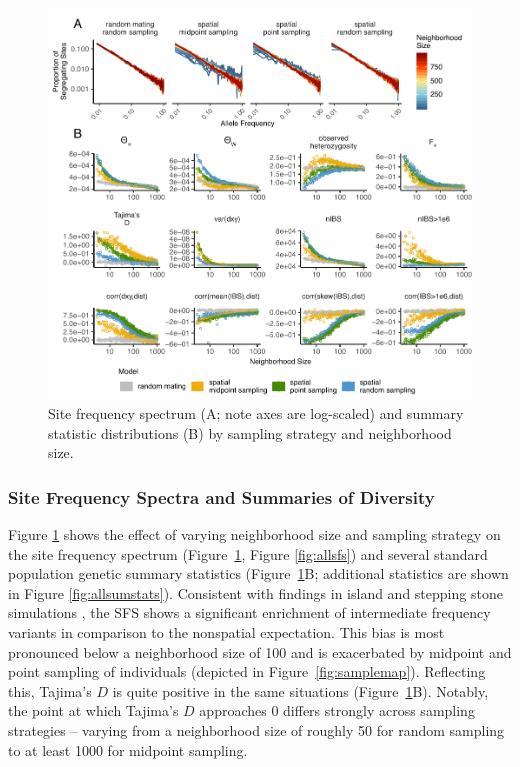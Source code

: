 \documentclass[10pt,twoside,lineno,hidelinks]{preprint}
\begin{document}
\begin{figure}[p]
\centering
\includegraphics[width=\textwidth]{figures/sfs_w_sumstats_loglog.pdf}
\caption{Site frequency spectrum (A; note axes are log-scaled) and summary statistic distributions (B) by sampling strategy and neighborhood size.}
\label{fig:sumstats}
\end{figure}


\subsubsection{Site Frequency Spectra and Summaries of Diversity}

Figure \ref{fig:sumstats} shows the effect of varying neighborhood size and sampling strategy on the site frequency spectrum (Figure~\ref{fig:sumstats}, Figure \ref{fig:allsfs}) and several standard population genetic summary statistics (Figure~\ref{fig:sumstats}B; additional statistics are shown in Figure \ref{fig:allsumstats}). Consistent with findings in island and stepping stone simulations \citep{Stadler2009}, the SFS shows a significant enrichment of intermediate frequency variants in comparison to the nonspatial expectation. This bias is most pronounced below a neighborhood size of 100 and is exacerbated by midpoint and point sampling of individuals (depicted in Figure~\ref{fig:samplemap}). 
Reflecting this, Tajima's $D$ is quite positive in the same situations (Figure~\ref{fig:sumstats}B). Notably, the point at which Tajima's $D$ approaches 0 differs strongly across sampling strategies -- varying from a neighborhood size of roughly 50 for random sampling to at least 1000 for midpoint sampling. 
\end{document}
